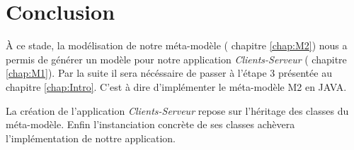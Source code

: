 \chapter{Conclusion}\label{chap:COnc}
À ce stade, la modélisation de notre méta-modèle (\cf{} chapitre \ref{chap:M2}) nous a permis de générer un modèle pour notre application \textit{Clients-Serveur} (\cf{} chapitre \ref{chap:M1}). Par la suite il sera nécéssaire de passer à l'étape 3 présentée au chapitre \ref{chap:Intro}. C'est à dire  d'implémenter le méta-modèle M2 en JAVA.

La création de l'application \textit{Clients-Serveur} repose sur l'héritage des classes du méta-modèle. Enfin l'instanciation concrète de ses classes achèvera l'implémentation de nottre application.
